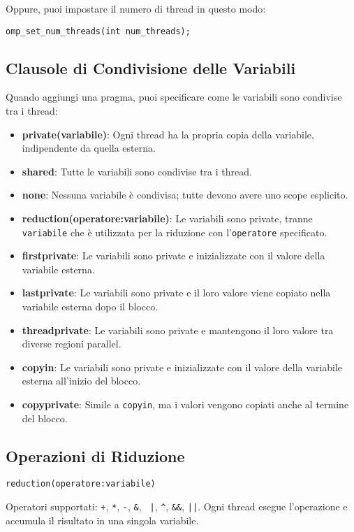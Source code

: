 \documentclass{article}
\begin{document}
Oppure, puoi impostare il numero di thread in questo modo:

\begin{verbatim}
omp_set_num_threads(int num_threads);
\end{verbatim}

\subsection{Clausole di Condivisione delle Variabili}
Quando aggiungi una pragma, puoi specificare come le variabili sono condivise tra i thread:
\begin{itemize}
    \item \textbf{private(variabile)}: Ogni thread ha la propria copia della variabile, indipendente da quella esterna.
    \item \textbf{shared}: Tutte le variabili sono condivise tra i thread.
    \item \textbf{none}: Nessuna variabile è condivisa; tutte devono avere uno scope esplicito.
    \item \textbf{reduction(operatore:variabile)}: Le variabili sono private, tranne \texttt{variabile} che è utilizzata per la riduzione con l'\texttt{operatore} specificato.
    \item \textbf{firstprivate}: Le variabili sono private e inizializzate con il valore della variabile esterna.
    \item \textbf{lastprivate}: Le variabili sono private e il loro valore viene copiato nella variabile esterna dopo il blocco.
    \item \textbf{threadprivate}: Le variabili sono private e mantengono il loro valore tra diverse regioni parallel.
    \item \textbf{copyin}: Le variabili sono private e inizializzate con il valore della variabile esterna all'inizio del blocco.
    \item \textbf{copyprivate}: Simile a \texttt{copyin}, ma i valori vengono copiati anche al termine del blocco.
\end{itemize}

\subsection{Operazioni di Riduzione}
\begin{verbatim}
reduction(operatore:variabile)
\end{verbatim}

Operatori supportati: \texttt{+}, \texttt{*}, \texttt{-}, \texttt{\&}, \texttt{ |}, \texttt{\^}, \texttt{\&\&}, \texttt{||}. Ogni thread esegue l'operazione e accumula il risultato in una singola variabile.
\end{document}
